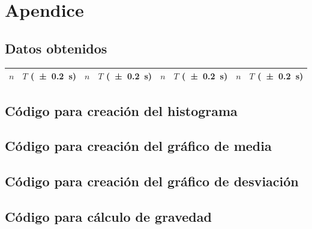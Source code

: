 \section{Apendice}

\subsection{Datos obtenidos}

\begin{table}[H]
    \footnotesize
    \centering
    \begin{tabular}{@{}r|r||r|r||r|r||r|r@{}}
        \toprule
        $n$ & $T$ (\SI{\pm 0.2}{\second}) & $n$ & $T$ (\SI{\pm 0.2}{\second}) & $n$ & $T$ (\SI{\pm 0.2}{\second}) & $n$ & $T$ (\SI{\pm 0.2}{\second}) \\ 
        \midrule
        
    \end{tabular}
\end{table}

\subsection{Código para creación del histograma}



\subsection{Código para creación del gráfico de media}



\newpage
\subsection{Código para creación del gráfico de desviación}



\newpage
\subsection{Código para cálculo de gravedad}






